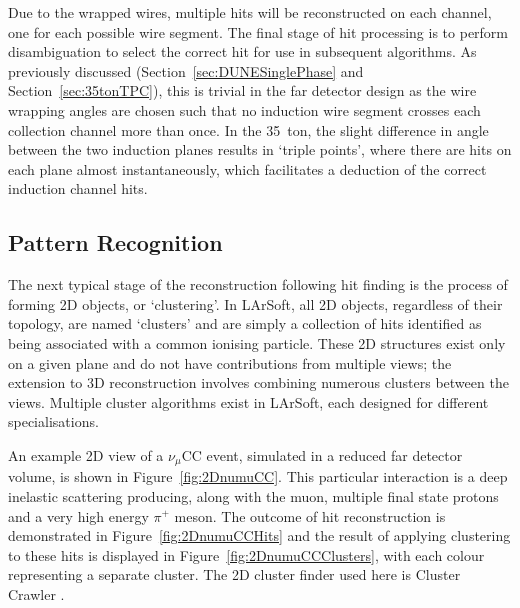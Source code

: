 Due to the wrapped wires, multiple hits will be reconstructed on each channel, one for each possible wire segment.  The final stage of hit processing is to perform disambiguation to select the correct hit for use in subsequent algorithms.  As previously discussed (Section~\ref{sec:DUNESinglePhase} and Section~\ref{sec:35tonTPC}), this is trivial in the far detector design as the wire wrapping angles are chosen such that no induction wire segment crosses each collection channel more than once.  In the 35~ton, the slight difference in angle between the two induction planes results in `triple points', where there are hits on each plane almost instantaneously, which facilitates a deduction of the correct induction channel hits.

\subsection{Pattern Recognition}\label{sec:PatternRecognition}

The next typical stage of the reconstruction following hit finding is the process of forming 2D objects, or `clustering'.  In LArSoft, all 2D objects, regardless of their topology, are named `clusters' and are simply a collection of hits identified as being associated with a common ionising particle.  These 2D structures exist only on a given plane and do not have contributions from multiple views; the extension to 3D reconstruction involves combining numerous clusters between the views.  Multiple cluster algorithms exist in LArSoft, each designed for different specialisations.

An example 2D view of a $\nu_{\mu}$CC event, simulated in a reduced far detector volume, is shown in Figure~\ref{fig:2DnumuCC}.  This particular interaction is a deep inelastic scattering producing, along with the muon, multiple final state protons and a very high energy $\pi^+$ meson.  The outcome of hit reconstruction is demonstrated in Figure~\ref{fig:2DnumuCCHits} and the result of applying clustering to these hits is displayed in Figure~\ref{fig:2DnumuCCClusters}, with each colour representing a separate cluster.  The 2D cluster finder used here is Cluster Crawler \cite{ClusterCrawler}.

